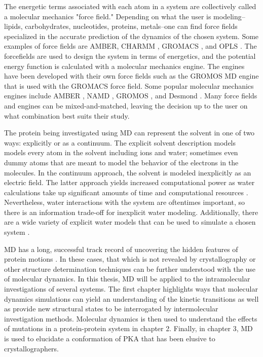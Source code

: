 \documentclass[12pt]{ucsddissertation}
\begin{document}
\begin{dissertationintroduction}
The energetic terms associated with each atom in a system are collectively called a molecular mechanics "force field." Depending on what the user is modeling-- lipids, carbohydrates, nucleotides, proteins, metals--one can find force fields specialized in the accurate prediction of the dynamics of the chosen system. Some examples of force fields are AMBER\cite{CaseD.A.BetzR.M.CeruttiD.S.CheathamT.E.IIIDardenT.A.DukeR.E.GieseT.J.GohlkeH.GoetzA.W.HomeyerN.IzadiS.JanowskiP.KausJ.KovalenkoA.LeeT.S.LeGrandS.LiP.LuchkoT.LuoR.MadejB.MerzK.M.MonardG.2015}, CHARMM \cite{Brooks2009}, GROMACS \cite{VanDerSpoel2005}, and OPLS \cite{Damm1997}. The forcefields are used to design the system in terms of energetics, and the potential energy function is calculated with a molecular mechanics engine. The engines have been developed with their own force fields such as the GROMOS MD engine \cite{Christen2005} that is used with the GROMACS force field. Some popular molecular mechanics engines include AMBER \cite{Pearlman1995}, NAMD \cite{Nelson1996}, GROMOS \cite{Christen2005}, and Desmond \cite{Bowers2006}. Many force fields and engines can be mixed-and-matched, leaving the decision up to the user on what combination best suits their study.

The protein being investigated using MD can represent the solvent in one of two ways: explicitly or as a continuum. The explicit solvent description models models every atom in the solvent including ions and water; sometimes even dummy atoms that are meant to model the behavior of the electrons in the molecules. In the continuum approach, the solvent is modeled inexplicitly as an electric field. The latter approach yields increased computational power as water calculations take up significant amounts of time and computational resources \cite{Anandakrishnan2015}. Nevertheless, water interactions with the system are oftentimes important, so there is an information trade-off for inexplicit water modeling. Additionally, there are a wide variety of explicit water models that can be used to simulate a chosen system \cite{Florova2010}. 

MD has a long, successful track record of uncovering the hidden features of protein motions \cite{Hospital2015}. In these cases, that which is not revealed by crystallography or other structure determination techniques can be further understood with the use of molecular dynamics. In this thesis, MD will be applied to the intramolecular investigations of several systems. The first chapter highlights ways that molecular dynamics simulations can yield an understanding of the kinetic transitions as well as provide new structural states to be interrogated by intermolecular investigation methods. Molecular dynamics is then used to understand the effects of mutations in a protein-protein system in chapter 2. Finally, in chapter 3, MD is used to elucidate a conformation of PKA that has been elusive to crystallographers.


\end{dissertationintroduction}
\end{document}
